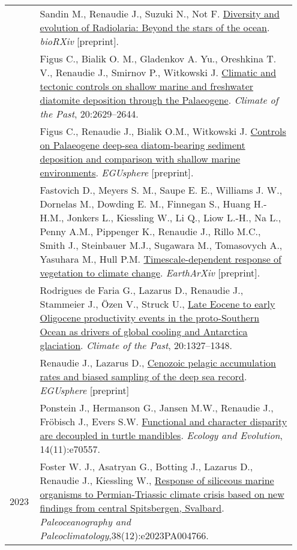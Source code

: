 \documentclass[11pt, a4paper]{article}
\begin{document}
\begin{longtable}{@{}p{0.1\linewidth} >{\small}P{0.85\linewidth}@{}}
    & Sandin M., Renaudie J., Suzuki N., Not F. \href{https://www.biorxiv.org/content/10.1101/2024.10.02.614131v1}{Diversity and evolution of Radiolaria: Beyond the stars of the ocean}. \textit{bioRXiv} [preprint].\\
    & Figus C., Bialik O. M., Gladenkov A. Yu., Oreshkina T. V., Renaudie J., Smirnov P., Witkowski J. \href{https://doi.org/10.5194/cp-20-2629-2024}{Climatic and tectonic controls on shallow marine and freshwater diatomite deposition through the Palaeogene}. \textit{Climate of the Past}, 20:2629--2644.\\
    & Figus C., Renaudie J., Bialik O.M., Witkowski J. \href{https://egusphere.copernicus.org/preprints/2024/egusphere-2024-3768/}{Controls on Palaeogene deep-sea diatom-bearing sediment deposition and comparison with shallow marine environments}. \textit{EGUsphere} [preprint].\\
    & Fastovich D., Meyers S. M., Saupe E. E., Williams J. W., Dornelas M., Dowding E. M., Finnegan S., Huang H.-H.M., Jonkers L., Kiessling W., Li Q., Liow L.-H., Na L., Penny A.M., Pippenger K., Renaudie J., Rillo M.C., Smith J., Steinbauer M.J., Sugawara M., Tomasovych A., Yasuhara M., Hull P.M. \href{https://doi.org/10.31223/X5S98P}{Timescale-dependent response of vegetation to climate change}. \textit{EarthArXiv} [preprint].\\
    & Rodrigues de Faria G., Lazarus D., Renaudie J., Stammeier J., Özen V., Struck U., \href{https://doi.org/10.5194/cp-20-1327-2024}{Late Eocene to early Oligocene productivity events in the proto-Southern Ocean as drivers of global cooling and Antarctica glaciation}. \textit{Climate of the Past}, 20:1327--1348.\\
    & Renaudie J., Lazarus D., \href{https://doi.org/10.5194/egusphere-2023-3087}{Cenozoic pelagic accumulation rates and biased sampling of the deep sea record}. \textit{EGUsphere} [preprint]\\
    & Ponstein J., Hermanson G., Jansen M.W., Renaudie J., Fröbisch J., Evers S.W. \href{https://doi.org/10.1002/ece3.70557}{Functional and character disparity are decoupled in turtle mandibles}. \textit{Ecology and Evolution}, 14(11):e70557.\\
2023 
    & Foster W. J., Asatryan G., Botting J., Lazarus D., Renaudie J., Kiessling W., \href{https://doi.org/10.1029/2023PA004766}{Response of siliceous marine organisms to Permian-Triassic climate crisis based on new findings from central Spitsbergen, Svalbard}. \textit{Paleoceanography and Paleoclimatology},38(12):e2023PA004766.\\

\end{longtable}
\end{document}
